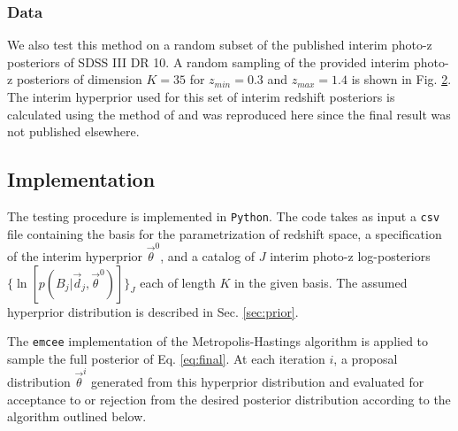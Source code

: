 \documentclass[preprint]{aastex}
\begin{document}
\begin{figure}
\caption{}
\label{fig:nullpzs}
\end{figure}

\subsubsection{Data}
\label{sec:data}

We also test this method on a random subset of the published interim photo-z 
posteriors of SDSS III DR 10.  A random sampling of the provided interim 
photo-z posteriors of dimension $K=35$ for $z_{min}=0.3$ and $z_{max}=1.4$ is 
shown in Fig. \ref{fig:datapzs}.  The interim hyperprior used for this set of 
interim redshift posteriors is calculated using the method of 
\citet{Sheldon2012} and was reproduced here since the final result was not 
published elsewhere.

\begin{figure}
\caption{}
\label{fig:datapzs}
\end{figure}

\clearpage
\subsection{Implementation}
\label{sec:mcmc}

The testing procedure is implemented in \texttt{Python}.  The code takes as 
input a \texttt{csv} file containing the basis for the parametrization of 
redshift space, a specification of the interim hyperprior $\vec{\theta}^{0}$, 
and a catalog of $J$ interim photo-z log-posteriors 
$\{\ln[p(B_{j}|\vec{d}_{j},\vec{\theta}^{0})]\}_{J}$ each of length $K$ in the 
given basis.  The assumed hyperprior distribution is described in Sec. 
\ref{sec:prior}.

The \texttt{emcee} implementation of the Metropolis-Hastings algorithm is 
applied to sample the full posterior of Eq. \ref{eq:final}.   
\citep{Foreman-Mackey2013}   At each iteration $i$, a proposal distribution 
$\vec{\theta}^{i}$ generated from this hyperprior distribution and evaluated 
for acceptance to or rejection from the desired posterior distribution 
according to the algorithm outlined below.  
\end{document}
